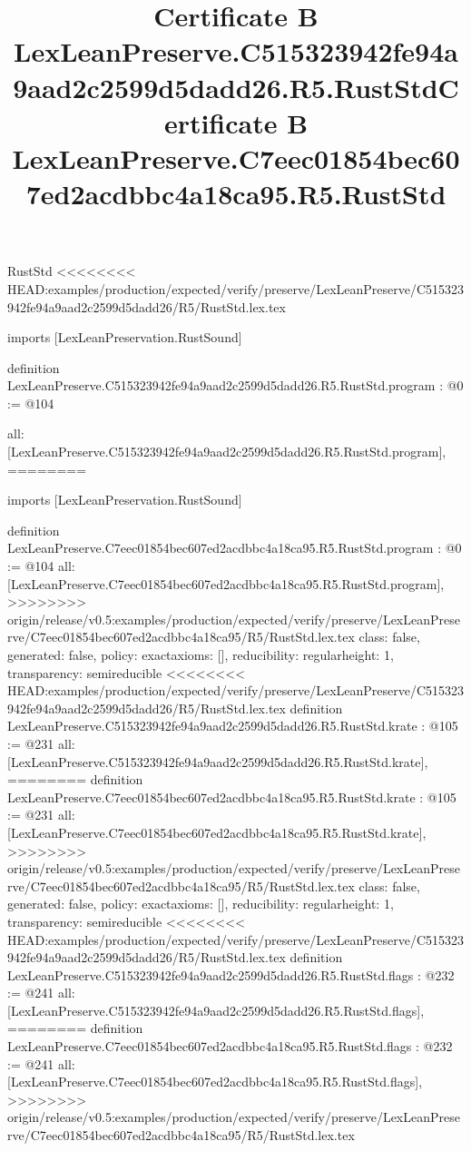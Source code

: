 \begin{lexlean}{RustStd}
<<<<<<<< HEAD:examples/production/expected/verify/preserve/LexLeanPreserve/C515323942fe94a9aad2c2599d5dadd26/R5/RustStd.lex.tex
\title{Certificate B LexLeanPreserve.C515323942fe94a9aad2c2599d5dadd26.R5.RustStd}
\begin{coremodule}
imports [LexLeanPreservation.RustSound]

definition LexLeanPreserve.C515323942fe94a9aad2c2599d5dadd26.R5.RustStd.program : @0 := @104 {
  all: [LexLeanPreserve.C515323942fe94a9aad2c2599d5dadd26.R5.RustStd.program],
========
\title{Certificate B LexLeanPreserve.C7eec01854bec607ed2acdbbc4a18ca95.R5.RustStd}
\begin{coremodule}
imports [LexLeanPreservation.RustSound]

definition LexLeanPreserve.C7eec01854bec607ed2acdbbc4a18ca95.R5.RustStd.program : @0 := @104 {
  all: [LexLeanPreserve.C7eec01854bec607ed2acdbbc4a18ca95.R5.RustStd.program],
>>>>>>>> origin/release/v0.5:examples/production/expected/verify/preserve/LexLeanPreserve/C7eec01854bec607ed2acdbbc4a18ca95/R5/RustStd.lex.tex
  class: false,
  generated: false,
  policy: exact{axioms: []},
  reducibility: regular{height: 1},
  transparency: semireducible
}
<<<<<<<< HEAD:examples/production/expected/verify/preserve/LexLeanPreserve/C515323942fe94a9aad2c2599d5dadd26/R5/RustStd.lex.tex
definition LexLeanPreserve.C515323942fe94a9aad2c2599d5dadd26.R5.RustStd.krate : @105 := @231 {
  all: [LexLeanPreserve.C515323942fe94a9aad2c2599d5dadd26.R5.RustStd.krate],
========
definition LexLeanPreserve.C7eec01854bec607ed2acdbbc4a18ca95.R5.RustStd.krate : @105 := @231 {
  all: [LexLeanPreserve.C7eec01854bec607ed2acdbbc4a18ca95.R5.RustStd.krate],
>>>>>>>> origin/release/v0.5:examples/production/expected/verify/preserve/LexLeanPreserve/C7eec01854bec607ed2acdbbc4a18ca95/R5/RustStd.lex.tex
  class: false,
  generated: false,
  policy: exact{axioms: []},
  reducibility: regular{height: 1},
  transparency: semireducible
}
<<<<<<<< HEAD:examples/production/expected/verify/preserve/LexLeanPreserve/C515323942fe94a9aad2c2599d5dadd26/R5/RustStd.lex.tex
definition LexLeanPreserve.C515323942fe94a9aad2c2599d5dadd26.R5.RustStd.flags : @232 := @241 {
  all: [LexLeanPreserve.C515323942fe94a9aad2c2599d5dadd26.R5.RustStd.flags],
========
definition LexLeanPreserve.C7eec01854bec607ed2acdbbc4a18ca95.R5.RustStd.flags : @232 := @241 {
  all: [LexLeanPreserve.C7eec01854bec607ed2acdbbc4a18ca95.R5.RustStd.flags],
>>>>>>>> origin/release/v0.5:examples/production/expected/verify/preserve/LexLeanPreserve/C7eec01854bec607ed2acdbbc4a18ca95/R5/RustStd.lex.tex
}}}
\end{coremodule}}
\end{coremodule}
\end{lexlean}
